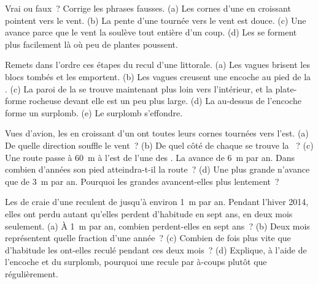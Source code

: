 \begin{exercise}[$\star$]\label{exo:g9:landforms:3}
Vrai ou faux~? Corrige les phrases fausses. (a) Les cornes d'une  en
croissant pointent vers le vent. (b) La pente d'une  tournée vers le
vent est douce. (c) Une  avance parce que le vent la soulève tout
entière d'un coup. (d) Les  se forment plus facilement là où peu de
plantes poussent.
\end{exercise}

\begin{exercise}[$\star$]\label{exo:g9:landforms:4}
Remets dans l'ordre ces étapes du recul d'une  littorale. (a) Les
vagues brisent les blocs tombés et les emportent. (b) Les vagues creusent
une encoche au pied de la . (c) La paroi de la  se trouve
maintenant plus loin vers l'intérieur, et la plate-forme rocheuse devant
elle est un peu plus large. (d) La  au-dessus de l'encoche forme un
surplomb. (e) Le surplomb s'effondre.
\end{exercise}

\begin{exercise}[$\star\star$]\label{exo:g9:landforms:5}
Vues d'avion, les  en croissant d'un  ont toutes leurs cornes
tournées vers l'est. (a) De quelle direction souffle le vent~? (b) De
quel côté de chaque  se trouve la ~? (c) Une route
passe à \qty{60}{m} à l'est de l'une des . La  avance de
\qty{6}{m} par an. Dans combien d'années son pied atteindra-t-il la
route~? (d) Une  plus grande n'avance que de \qty{3}{m} par an.
Pourquoi les grandes  avancent-elles plus lentement~?
\end{exercise}

\begin{exercise}[$\star\star$]\label{exo:g9:landforms:6}
Les  de craie d'une  reculent de jusqu'à environ \qty{1}{m}
par an. Pendant l'hiver 2014, elles ont perdu autant qu'elles perdent
d'habitude en sept ans, en deux mois seulement. (a) À \qty{1}{m} par an,
combien perdent-elles en sept ans~? (b) Deux mois représentent quelle
fraction d'une année~? (c) Combien de fois plus vite que d'habitude les
 ont-elles reculé pendant ces deux mois~? (d) Explique, à l'aide
de l'encoche et du surplomb, pourquoi une  recule par à-coups
plutôt que régulièrement.
\end{exercise}

